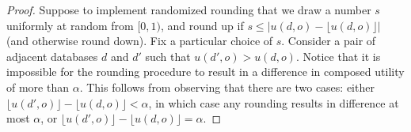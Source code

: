 \documentclass[11pt]{article}
\theoremstyle{definition}
\begin{document}
\begin{proof}

Suppose to implement randomized rounding that we draw a number $s$ uniformly at random from $[0,1)$, and round up if $s \leq |u(d,o)-\lfloor{u(d,o)} \rfloor|$ (and otherwise round down). 
Fix a particular choice of $s$. Consider a pair of adjacent databases $d$ and $d'$ such that $u(d',o)>u(d,o)$. Notice that it is impossible for the rounding procedure to result in a difference in composed utility of more than $\alpha$. This follows from observing that there are two cases: either $\lfloor{u(d',o)} \rfloor - \lfloor{u(d,o)} \rfloor < \alpha$, in which case any rounding results in difference at most $\alpha$, or $\lfloor{u(d',o)} \rfloor - \lfloor{u(d,o)} \rfloor = \alpha$.


\end{proof}
\end{document}
